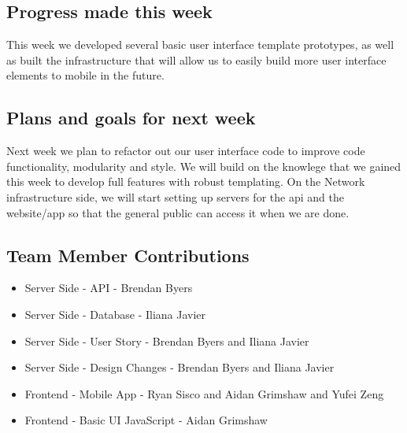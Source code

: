 \documentclass[12pt]{article}
\begin{document}
\subsection{Progress made this week}
This week we developed several basic user interface template prototypes, as well as built the infrastructure that will allow us to easily build more user interface elements to mobile in the future.
\subsection{Plans and goals for next week}
Next week we plan to refactor out our user interface code to improve code functionality, modularity and style. We will build on the knowlege that we gained this week to develop full features with robust templating. On the Network infrastructure side, we will start setting up servers for the api and the website/app so that the general public can access it when we are done.
\subsection{Team Member Contributions}
\begin{itemize}
      \item Server Side - API - Brendan Byers
      \item Server Side - Database - Iliana Javier
      \item Server Side - User Story - Brendan Byers and Iliana Javier
      \item Server Side - Design Changes - Brendan Byers and Iliana Javier
      \item Frontend - Mobile App - Ryan Sisco and Aidan Grimshaw and Yufei Zeng
      \item Frontend - Basic UI JavaScript - Aidan Grimshaw
\end{itemize}
\end{document}
